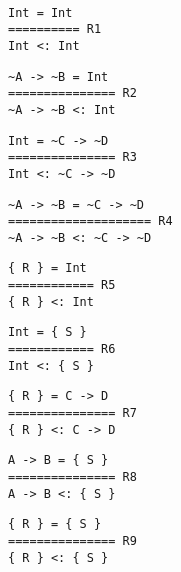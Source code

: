 \begin{example}{~}

\begin{minipage}{.25\linewidth}
\begin{lstlisting}[language=sltc]
Int = Int
========== R1
Int <: Int
\end{lstlisting}
\end{minipage}
\begin{minipage}{.35\linewidth}
\begin{lstlisting}[language=sltc]
~A -> ~B = Int
=============== R2
~A -> ~B <: Int
\end{lstlisting}
\end{minipage}
\begin{minipage}{.3\linewidth}
\begin{lstlisting}[language=sltc]
Int = ~C -> ~D
=============== R3
Int <: ~C -> ~D
\end{lstlisting}
\end{minipage}

\begin{minipage}{.38\linewidth}
\begin{lstlisting}[language=sltc]
~A -> ~B = ~C -> ~D
==================== R4
~A -> ~B <: ~C -> ~D
\end{lstlisting}
\end{minipage}
\begin{minipage}{.25\linewidth}
\begin{lstlisting}[language=sltc]
{ R } = Int
============ R5
{ R } <: Int
\end{lstlisting}
\end{minipage}
\begin{minipage}{.25\linewidth}
\begin{lstlisting}[language=sltc]
Int = { S }
============ R6
Int <: { S }
\end{lstlisting}
\end{minipage}

\begin{minipage}{.30\linewidth}
\begin{lstlisting}[language=sltc]
{ R } = C -> D
=============== R7
{ R } <: C -> D
\end{lstlisting}
\end{minipage}
\begin{minipage}{.30\linewidth}
\begin{lstlisting}[language=sltc]
A -> B = { S }
=============== R8
A -> B <: { S }
\end{lstlisting}
\end{minipage}
\begin{minipage}{.30\linewidth}
\begin{lstlisting}[language=sltc]
{ R } = { S }
=============== R9
{ R } <: { S }
\end{lstlisting}
\end{minipage}
\label{ex:unfolded-refl}
\end{example}

